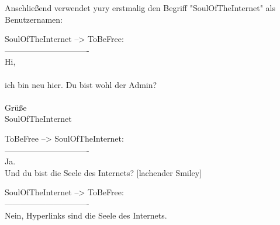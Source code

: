 Anschließend verwendet yury erstmalig den Begriff "SoulOfTheInternet" als Benutzernamen:

\noindent \parbox{\textwidth}{

    \begin{footnotesize}
    \begin{itshape}

\noindent SoulOfTheInternet --> ToBeFree:\\
\noindent -------------------------------\\
\noindent Hi,\\
\noindent ~\\
\noindent ich bin neu hier. Du bist wohl der Admin?\\
\noindent ~\\
\noindent Grüße\\
\noindent SoulOfTheInternet\\

    \end{itshape}
    \end{footnotesize}

}

\noindent \parbox{\textwidth}{

    \begin{footnotesize}
    \begin{itshape}
    \begin{flushright}

\noindent ToBeFree --> SoulOfTheInternet:\\
\noindent -------------------------------\\
\noindent Ja.\\
\noindent Und du bist die Seele des Internets? [lachender Smiley]\\

    \end{flushright}
    \end{itshape}
    \end{footnotesize}

}

\noindent \parbox{\textwidth}{

    \begin{footnotesize}
    \begin{itshape}

\noindent SoulOfTheInternet --> ToBeFree:\\
\noindent -------------------------------\\
\noindent Nein, Hyperlinks sind die Seele des Internets.\\

    \end{itshape}
    \end{footnotesize}

}


